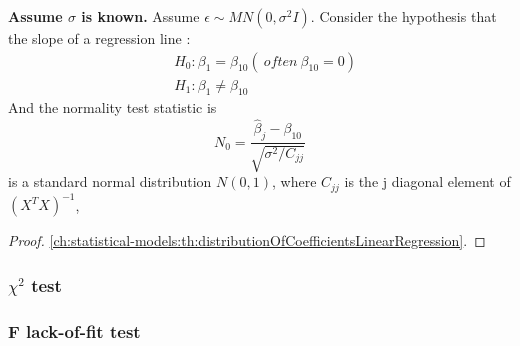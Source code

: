 \begin{refsection}
\begin{lemma}\cite[261]{chinese2008probability}
	\textbf{Assume $\sigma$ is known.}	Assume $\epsilon \sim MN(0,\sigma^2 I)$. Consider the hypothesis that the slope of a regression line :
	\begin{align*}
	&H_0: \beta_1 = \beta_{10} (~often ~ \beta_{10} = 0)\\
	&H_1: \beta_1 \neq \beta_{10}
	\end{align*}
	And the normality test statistic is
	$$N_0 = \frac{\hat{\beta}_j - \beta_{10}}{\sqrt{\sigma^2/C_{jj}}}$$
	is a standard normal distribution $N(0,1)$,	where $C_{jj}$ is the j diagonal element of $(X^TX)^{-1}$,
\end{lemma}
\begin{proof}
	\autoref{ch:statistical-models:th:distributionOfCoefficientsLinearRegression}.
\end{proof}

\subsubsection{$\chi^2$ test}



\subsubsection{F lack-of-fit test}



\end{refsection}
